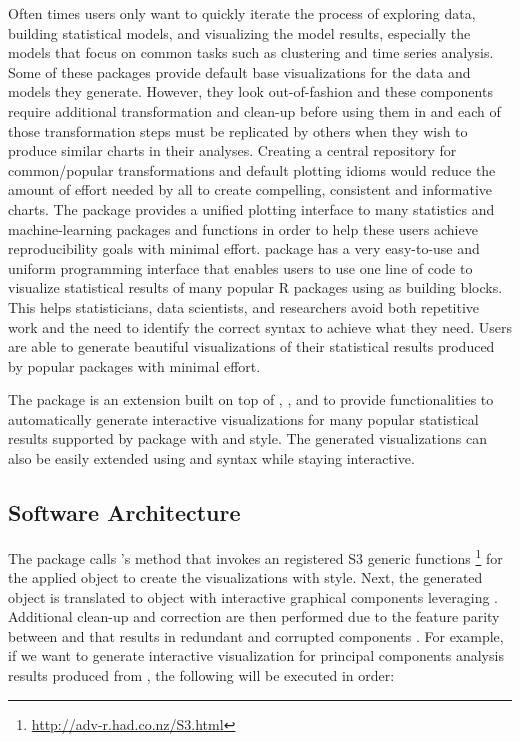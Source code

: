 Often times users only want to quickly iterate the process of exploring
data, building statistical models, and visualizing the model results,
especially the models that focus on common tasks such as clustering and
time series analysis. Some of these packages provide default base
 visualizations for the data and models they generate.
However, they look out-of-fashion and these components require
additional transformation and clean-up before using them in
 and each of those transformation steps must be replicated
by others when they wish to produce similar charts in their analyses.
Creating a central repository for common/popular transformations and
default plotting idioms would reduce the amount of effort needed by all
to create compelling, consistent and informative charts. The
 \citep{rjggfortify} package provides a unified
 plotting interface to many statistics and machine-learning
packages and functions in order to help these users achieve
reproducibility goals with minimal effort.  package has a
very easy-to-use and uniform programming interface that enables users to
use one line of code to visualize statistical results of many popular R
packages using  as building blocks. This helps
statisticians, data scientists, and researchers avoid both repetitive
work and the need to identify the correct  syntax to
achieve what they need. Users are able to generate beautiful
visualizations of their statistical results produced by popular packages
with minimal effort.

The  \citep{autoplotly} package is an extension
built on top of , , and  to
provide functionalities to automatically generate interactive
visualizations for many popular statistical results supported by
 package with  and  style. The
generated visualizations can also be easily extended using 
and  syntax while staying interactive.

\subsection{Software Architecture}\label{software-architecture}

The  package calls 's 
method that invokes an registered S3 generic functions
\footnote{\url{http://adv-r.had.co.nz/S3.html}} for the applied object
to create the visualizations with  style. Next, the
generated  object is translated to  object
with interactive graphical components leveraging
. Additional clean-up and correction are then
performed due to the feature parity between  and
 that results in redundant and corrupted components . For
example, if we want to generate interactive visualization for principal
components analysis results produced from , the
following will be executed in order:

